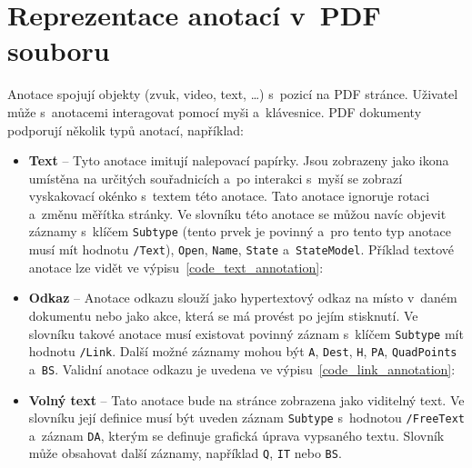 \section{Reprezentace anotací v~PDF souboru} \label{PDF_annotations}
Anotace spojují objekty (zvuk, video, text, \dots) s~pozicí na PDF stránce.
Uživatel může s~anotacemi interagovat pomocí myši a~klávesnice.
 PDF dokumenty podporují několik typů anotací, 
například:
\begin{itemize}
    \item \textbf{Text} -- Tyto anotace imitují nalepovací papírky. Jsou
    zobrazeny jako ikona umístěna na určitých souřadnicích a~po interakci s~myší
    se zobrazí vyskakovací okénko s~textem této anotace. Tato anotace ignoruje
    rotaci a~změnu měřítka stránky. Ve slovníku této anotace se můžou navíc
    objevit záznamy s~klíčem \texttt{Subtype} (tento prvek je povinný a~pro tento
    typ anotace musí mít hodnotu \texttt{/Text}), \texttt{Open}, \texttt{Name},
    \texttt{State} a~\texttt{StateModel}. Příklad textové anotace lze vidět ve
    výpisu~\ref{code_text_annotation}:

    \item \textbf{Odkaz} -- Anotace odkazu slouží jako hypertextový
    odkaz na místo v~daném dokumentu nebo jako akce, která se má
    provést po jejím stisknutí. Ve slovníku takové anotace musí
    existovat povinný záznam s~klíčem \texttt{Subtype} mít hodnotu
    \texttt{/Link}. Další možné záznamy mohou být \texttt{A},
    \texttt{Dest}, \texttt{H}, \texttt{PA}, \texttt{QuadPoints}
    a~\texttt{BS}. Validní anotace odkazu je uvedena ve
    výpisu~\ref{code_link_annotation}:
    
    \item \textbf{Volný text} -- Tato anotace bude na stránce
    zobrazena jako viditelný text. Ve slovníku její definice
    musí být uveden záznam \texttt{Subtype} s~hodnotou
    \texttt{/FreeText} a~záznam \texttt{DA}, kterým se definuje
    grafická úprava vypsaného textu. Slovník může obsahovat další
    záznamy, například \texttt{Q}, \texttt{IT} nebo \texttt{BS}.
    

\end{itemize}
